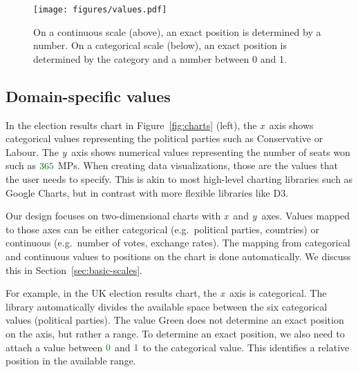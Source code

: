 \documentclass{jfp}
\newcommand{\X}{\emph{x}\ }
\newcommand{\Y}{\emph{y}\ }
\newcommand{\num}[1]{\textcolor{numclr}{#1}}
\newcommand{\strf}[1]{\textnormal{\textcolor{strclr}{\sffamily #1}}}
\begin{document}
\begin{figure}[t]
\texttt{[image: figures/values.pdf]}
\caption{On a continuous scale (above), an exact position is determined by a number.
  On a categorical scale (below), an exact position is determined by the category and a
  number between 0 and 1.}
\label{fig:scales}
\end{figure}

\subsection{Domain-specific values}

In the election results chart in Figure~\ref{fig:charts} (left), the \X axis shows categorical
values representing the political parties such as \strf{Conservative} or \strf{Labour}. The
\Y axis shows numerical values representing the number of seats won such as $\num{365}$ MPs.
When creating data visualizations, those are the values that the user needs to specify. This is
akin to most high-level charting libraries such as Google Charts, but in contrast with more
flexible libraries like D3.

Our design focuses on two-dimensional charts with \X and \Y axes. Values mapped to those axes
can be either categorical (e.g.~political parties, countries) or continuous
(e.g.~number of votes, exchange rates). The mapping from categorical and continuous values
to positions on the chart is done automatically. We discuss this in Section~\ref{sec:basic-scales}.

For example, in the UK election results chart, the \X axis is categorical. The library automatically
divides the available space between the six categorical values (political parties). The value
\strf{Green} does not determine an exact position on the axis, but rather a range. To determine
an exact position, we also need to attach a value between $\num{0}$ and $\num{1}$ to the
categorical value. This identifies a relative position in the available range.
\end{document}
